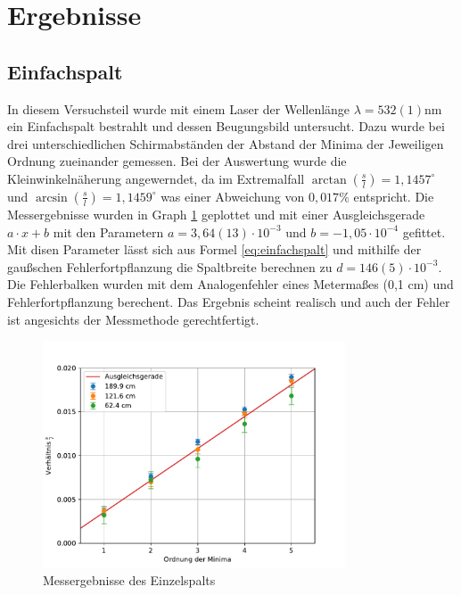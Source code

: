 \documentclass[11pt, a4paper]{article}
\begin{document}
    \section{Ergebnisse}
    \subsection{Einfachspalt}
    In diesem Versuchsteil wurde mit einem Laser der Wellenlänge $\lambda = 532(1)\si{\nano\meter}$ ein Einfachspalt bestrahlt und dessen Beugungsbild untersucht.
    Dazu wurde bei drei unterschiedlichen Schirmabständen der Abstand der Minima der Jeweiligen Ordnung zueinander gemessen. Bei der Auswertung wurde die Kleinwinkelnäherung angewerndet, da im Extremalfall $\arctan(\frac{s}{l}) = 1,1457^{\circ}$ und $\arcsin(\frac{s}{l}) = 1,1459^{\circ}$
    was einer Abweichung von $0,017\%$ entspricht. Die Messergebnisse wurden in Graph \ref{fig:einzelspalt} geplottet und mit einer Ausgleichsgerade $a \cdot x + b$ mit den Parametern $a = 3,64(13) \cdot 10^{-3}$ und $b= -1,05 \cdot 10^{-4}$ gefittet.
    Mit disen Parameter lässt sich aus Formel \ref{eq:einfachspalt} und mithilfe der gaußschen Fehlerfortpflanzung die Spaltbreite berechnen zu $d= 146(5) \cdot 10^{-3}$. Die Fehlerbalken wurden mit dem Analogenfehler eines Metermaßes (0,1 cm) und Fehlerfortpflanzung berechent.
    Das Ergebnis scheint realisch und auch der Fehler ist angesichts der Messmethode gerechtfertigt.
    


    \begin{figure}
        \centering
        \includegraphics[width=0.8\textwidth]{./plots/einzelspalt.pdf}
        \caption{Messergebnisse des Einzelspalts}
        \label{fig:einzelspalt}
    \end{figure}
\end{document}
